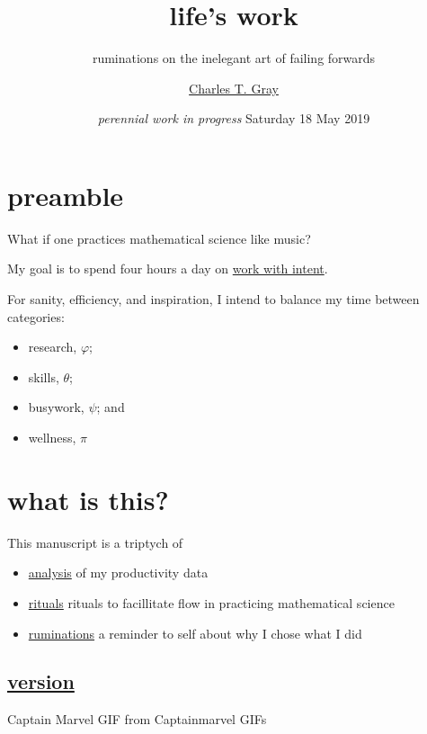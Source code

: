 \documentclass[]{book}
\title{life's work}
\subtitle{ruminations on the inelegant art of failing forwards}
\author{\href{http://cantabile.rbind.io/about.html}{Charles T. Gray}}
\date{\emph{perennial work in progress} Saturday 18 May 2019}
\providecommand{\tightlist}{%
  \setlength{\itemsep}{0pt}\setlength{\parskip}{0pt}}
\begin{document}
\maketitle

{
\setcounter{tocdepth}{1}
\tableofcontents
}
\hypertarget{preamble}{%
\chapter{preamble}\label{preamble}}

What if one practices mathematical science like music?

My goal is to spend four hours a day on \protect\hyperlink{work-with-intent}{work with intent}.

For sanity, efficiency, and inspiration, I intend to balance my time between categories:

\begin{itemize}
\tightlist
\item
  research, \(\varphi\);
\item
  skills, \(\theta\);\\
\item
  busywork, \(\psi\); and
\item
  wellness, \(\pi\)
\end{itemize}

\hypertarget{what-is-this}{%
\chapter{what is this?}\label{what-is-this}}

This manuscript is a triptych of

\begin{itemize}
\tightlist
\item
  \protect\hyperlink{analysis}{analysis} of my productivity data
\item
  \protect\hyperlink{rituals}{rituals} rituals to facillitate flow in practicing mathematical science
\item
  \protect\hyperlink{ruminations}{ruminations} a reminder to self about why I chose what I did
\end{itemize}

\hypertarget{version}{%
\section{\texorpdfstring{\protect\hyperlink{mindfulness}{version}}{version}}\label{version}}

Captain Marvel GIF from Captainmarvel GIFs
\end{document}
